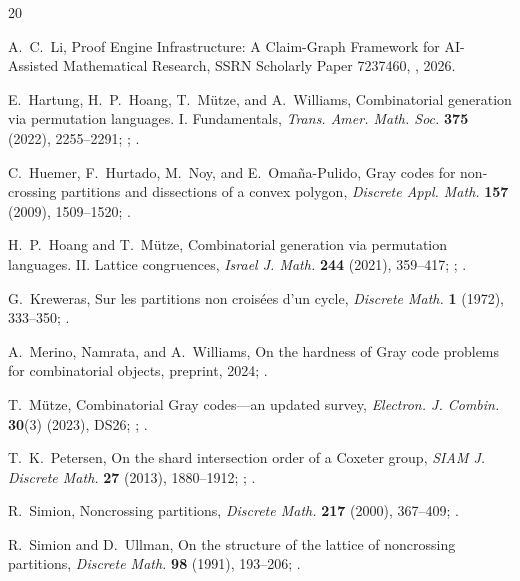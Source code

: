 \documentclass[12pt]{article}
\begin{document}
\begin{thebibliography}{20}

A.~C.~Li,
Proof Engine Infrastructure: A Claim-Graph Framework for AI-Assisted
Mathematical Research,
SSRN Scholarly Paper 7237460, , 2026.

E.~Hartung, H.~P.~Hoang, T.~M\"utze, and A.~Williams,
Combinatorial generation via permutation languages. I. Fundamentals,
\emph{Trans. Amer. Math. Soc.} \textbf{375} (2022), 2255--2291;
; .

C.~Huemer, F.~Hurtado, M.~Noy, and E.~Oma\~na-Pulido,
Gray codes for non-crossing partitions and dissections of a convex polygon,
\emph{Discrete Appl. Math.} \textbf{157} (2009), 1509--1520;
.

H.~P.~Hoang and T.~M\"utze,
Combinatorial generation via permutation languages. II. Lattice congruences,
\emph{Israel J. Math.} \textbf{244} (2021), 359--417;
; .

G.~Kreweras,
Sur les partitions non crois\'ees d'un cycle,
\emph{Discrete Math.} \textbf{1} (1972), 333--350;
.

A.~Merino, Namrata, and A.~Williams,
On the hardness of Gray code problems for combinatorial objects,
preprint, 2024; .

T.~M\"utze,
Combinatorial Gray codes---an updated survey,
\emph{Electron. J. Combin.} \textbf{30}(3) (2023), DS26;
; .

T.~K.~Petersen,
On the shard intersection order of a Coxeter group,
\emph{SIAM J. Discrete Math.} \textbf{27} (2013), 1880--1912;
; .

R.~Simion,
Noncrossing partitions,
\emph{Discrete Math.} \textbf{217} (2000), 367--409;
.

R.~Simion and D.~Ullman,
On the structure of the lattice of noncrossing partitions,
\emph{Discrete Math.} \textbf{98} (1991), 193--206;
.

\end{thebibliography}
\end{document}
